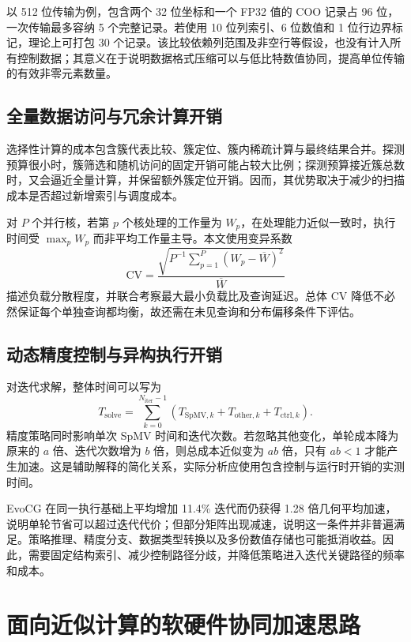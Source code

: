 以 512 位传输为例，包含两个 32 位坐标和一个 FP32 值的 COO 记录占 96 位，一次传输最多容纳 5 个完整记录。若使用 10 位列索引、6 位数值和 1 位行边界标记，理论上可打包 30 个记录。该比较依赖列范围及非空行等假设，也没有计入所有控制数据；其意义在于说明数据格式压缩可以与低比特数值协同，提高单位传输的有效非零元素数量。

\subsection{全量数据访问与冗余计算开销}
选择性计算的成本包含簇代表比较、簇定位、簇内稀疏计算与最终结果合并。探测预算很小时，簇筛选和随机访问的固定开销可能占较大比例；探测预算接近簇总数时，又会逼近全量计算，并保留额外簇定位开销。因而，其优势取决于减少的扫描成本是否超过新增索引与调度成本。

对 $P$ 个并行核，若第 $p$ 个核处理的工作量为 $W_p$，在处理能力近似一致时，执行时间受 $\max_p W_p$ 而非平均工作量主导。本文使用变异系数
\begin{equation}
 \mathrm{CV}=\frac{\sqrt{P^{-1}\sum_{p=1}^{P}(W_p-\overline W)^2}}{\overline W}
\end{equation}
描述负载分散程度，并联合考察最大最小负载比及查询延迟。总体 CV 降低不必然保证每个单独查询都均衡，故还需在未见查询和分布偏移条件下评估。

\subsection{动态精度控制与异构执行开销}
对迭代求解，整体时间可以写为
\begin{equation}
 T_{\mathrm{solve}}=\sum_{k=0}^{N_{\mathrm{iter}}-1}
 (T_{\mathrm{SpMV},k}+T_{\mathrm{other},k}+T_{\mathrm{ctrl},k}).
 \label{eq:solvecost}
\end{equation}
精度策略同时影响单次 SpMV 时间和迭代次数。若忽略其他变化，单轮成本降为原来的 $a$ 倍、迭代次数增为 $b$ 倍，则总成本近似变为 $ab$ 倍，只有 $ab<1$ 才能产生加速。这是辅助解释的简化关系，实际分析应使用包含控制与运行时开销的实测时间。

EvoCG 在同一执行基础上平均增加 11.4\% 迭代而仍获得 1.28 倍几何平均加速，说明单轮节省可以超过迭代代价；但部分矩阵出现减速，说明这一条件并非普遍满足\cite{evocg2027}。策略推理、精度分支、数据类型转换以及多份数值存储也可能抵消收益。因此，需要固定结构索引、减少控制路径分歧，并降低策略进入迭代关键路径的频率和成本。

\section{面向近似计算的软硬件协同加速思路}
